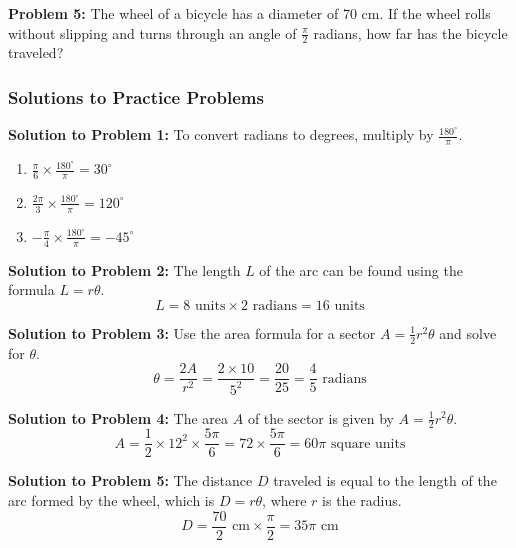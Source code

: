 \documentclass[a4paper,12pt]{book}
\newcounter{problem}
\begin{document}
\textbf{Problem 5:} The wheel of a bicycle has a diameter of 70 cm. If the wheel rolls without slipping and turns through an angle of \( \frac{\pi}{2} \) radians, how far has the bicycle traveled?

\subsubsection*{Solutions to Practice Problems}

\textbf{Solution to Problem 1:} To convert radians to degrees, multiply by \( \frac{180^\circ}{\pi} \).
\begin{enumerate}[label=\alph*.]
  \item \( \frac{\pi}{6} \times \frac{180^\circ}{\pi} = 30^\circ \)
  \item \( \frac{2\pi}{3} \times \frac{180^\circ}{\pi} = 120^\circ \)
  \item \( -\frac{\pi}{4} \times \frac{180^\circ}{\pi} = -45^\circ \)
\end{enumerate}

\textbf{Solution to Problem 2:} The length \( L \) of the arc can be found using the formula \( L = r\theta \).
\[ L = 8 \text{ units} \times 2 \text{ radians} = 16 \text{ units} \]

\textbf{Solution to Problem 3:} Use the area formula for a sector \( A = \frac{1}{2} r^2 \theta \) and solve for \( \theta \).
\[ \theta = \frac{2A}{r^2} = \frac{2 \times 10}{5^2} = \frac{20}{25} = \frac{4}{5} \text{ radians} \]

\textbf{Solution to Problem 4:} The area \( A \) of the sector is given by \( A = \frac{1}{2} r^2 \theta \).
\[ A = \frac{1}{2} \times 12^2 \times \frac{5\pi}{6} = 72 \times \frac{5\pi}{6} = 60\pi \text{ square units} \]

\textbf{Solution to Problem 5:} The distance \( D \) traveled is equal to the length of the arc formed by the wheel, which is \( D = r\theta \), where \( r \) is the radius.
\[ D = \frac{70}{2} \text{ cm} \times \frac{\pi}{2} = 35\pi \text{ cm} \]


\end{document}
